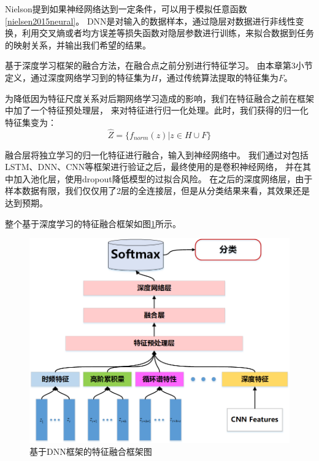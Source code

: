 Nielson提到如果神经网络达到一定条件，可以用于模拟任意函数\ref{nielsen2015neural}。
DNN是对输入的数据样本，通过隐层对数据进行非线性变换，利用交叉熵或者均方误差等损失函数对隐层参数进行训练，来拟合数据到任务的映射关系，并输出我们希望的结果。\par

基于深度学习框架的融合方法，在融合点之前分别进行特征学习。
由本章第3小节定义，通过深度网络学习到的特征集为$H$，通过传统算法提取的特征集为$F$。\par

为降低因为特征尺度关系对后期网络学习造成的影响，我们在特征融合之前在框架中加了一个特征预处理层，
来对特征进行归一化处理。此时，我们获得的归一化特征集变为：
\begin{equation}
	\label{eqt_4_23}
	\hat{Z} =\{ f_{norm}(z) | z \in H \cup F \}
\end{equation}

融合层将独立学习的归一化特征进行融合，输入到神经网络中。
我们通过对包括LSTM、DNN、CNN等框架进行验证之后，最终使用的是卷积神经网络，
并在其中加入池化层，使用dropout降低模型的过拟合风险。
在之后的深度网络层，由于样本数据有限，我们仅仅用了2层的全连接层，但是从分类结果来看，其效果还是达到预期。\par

整个基于深度学习的特征融合框架如图\ref{sec:fig_4_3}所示。
\begin{figure}[!h]
	\centering
	\includegraphics[scale=0.55]{figures/chapter_4/fig_4_3}
	\caption{基于DNN框架的特征融合框架图}\label{sec:fig_4_3}
\end{figure}


